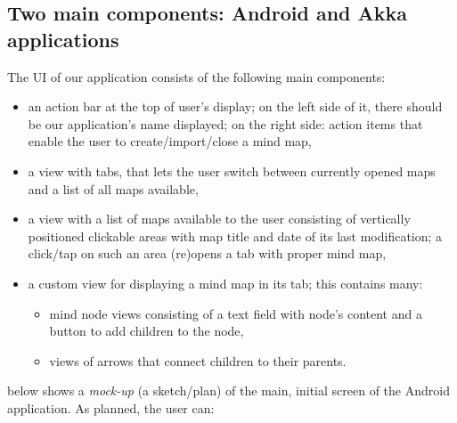%
%
%
%
%

\subsection{Two main components: Android and Akka applications}
\label{subsec:component-android}


The UI of our application consists of the following main components:

\begin{itemize}
	\item an action bar at the top of user's display; on the left side of it, there should be our application's name displayed; on the right side: action items that enable the user to create/import/close a mind map,
	\item a view with tabs, that lets the user switch between currently opened maps and a list of all maps available,
	\item a view with a list of maps available to the user consisting of vertically positioned clickable areas with map title and date of its last modification; a click/tap on such an area (re)opens a tab with proper mind map,
	\item a custom view for displaying a mind map in its tab; this contains many:\begin{itemize}
		\item mind node views consisting of a text field with node's content and a button to add children to the node,
		\item views of arrows that connect children to their parents.
	\end{itemize}
\end{itemize}

 below shows a \emph{mock-up} (a sketch/plan) of the main, initial screen of the Android application. As planned, the user can:


